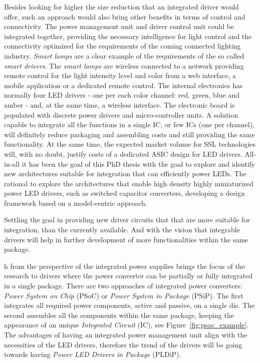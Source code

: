 Besides looking for higher the size reduction that an integrated driver would offer, such an approach would also bring other benefits in terms of control and connectivity.  The power management unit and driver control unit could be integrated together, providing the necessary intelligence for light control and the connectivity optimized for the requirements of the coming connected lighting industry. \emph{Smart lamps} are a clear example of the requirements of the so called \emph{smart drivers}. The \emph{smart lamps} are wireless connected to a network providing remote control for the light intensity level and color from a web interface, a mobile application or a dedicated remote control. The internal electronics has normally four LED drivers - one per each color channel: red, green, blue and amber - and, at the same time, a wireless interface. The electronic board is populated with discrete power drivers and micro-controller units. A solution capable to integrate all the functions in a single IC, or few ICs (one per channel), will definitely reduce packaging and assembling costs and still providing the same functionality. At the same time, the expected market volume for SSL technologies will, with no doubt,  justify costs of a dedicated ASIC design for LED drivers. All-in-all it has been the goal of this PhD thesis with the goal to explore and identify new architectures suitable for  integration that can efficiently power LEDs. The rational to explore the architectures that enable high density highly miniaturized power LED drivers, such as switched capacitor converters, developing a design framework based on a model-centric approach.


Settling the goal in providing new driver circuits that that are more suitable for integration, than the currently available. And with the vision that integrable drivers will help in further development of more functionalities within the same package.

 h from the perspective of the integrated power supplies brings the focus of the research to drivers where the power converter can be partially or fully integrated in a single package. There are two approaches of integrated power converters: \emph{Power System on Chip} (PSoC) or  \emph{Power System in Package} (PSiP). The first integrates all required power components, active and passive, on a single die. The second assembles all the components within the same package, keeping the appearance of an unique \emph{Integrated Circuit} (IC), see Figure~\ref{fig:psoc_example}. The advantages of having an integrated power management unit align with the necessities of the LED drivers, therefore the trend of the drivers will be going towards having \emph{Power LED Drivers in Package} (PLDiP).

